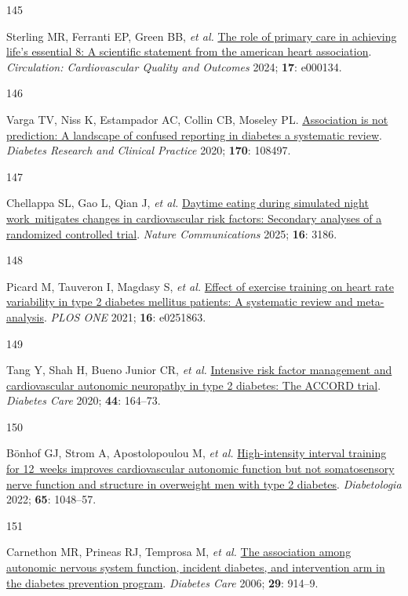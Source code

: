 \documentclass[
  a4paper,
  headsepline=true,
  open=left]{scrbook}
\newlength{\cslhangindent}
\newlength{\csllabelwidth}
\newlength{\cslentryspacingunit} %
\newenvironment{CSLReferences}[2] %
 {%
  \setlength{\parindent}{0pt}
  \ifodd #1
  \let\oldpar\par
  \def\par{\hangindent=\cslhangindent\oldpar}
  \fi
  \setlength{\parskip}{#2\cslentryspacingunit}
 }%
 {}
\newcommand{\CSLLeftMargin}[1]{\parbox[t]{\csllabelwidth}{#1}}
\newcommand{\CSLRightInline}[1]{\parbox[t]{\linewidth - \csllabelwidth}{#1}\break}
\begin{document}
\begin{CSLReferences}{0}{0}
\leavevmode{}%
\CSLLeftMargin{145 }%
\CSLRightInline{Sterling MR, Ferranti EP, Green BB, \emph{et al.}
\href{https://doi.org/10.1161/HCQ.0000000000000134}{The role of primary
care in achieving life{'}s essential 8: A scientific statement from the
american heart association}. \emph{Circulation: Cardiovascular Quality
and Outcomes} 2024; \textbf{17}: e000134.}

\leavevmode{}%
\CSLLeftMargin{146 }%
\CSLRightInline{Varga TV, Niss K, Estampador AC, Collin CB, Moseley PL.
\href{https://doi.org/10.1016/j.diabres.2020.108497}{Association is not
prediction: A landscape of confused reporting in diabetes {\textendash}
a systematic review}. \emph{Diabetes Research and Clinical Practice}
2020; \textbf{170}: 108497.}

\leavevmode{}%
\CSLLeftMargin{147 }%
\CSLRightInline{Chellappa SL, Gao L, Qian J, \emph{et al.}
\href{https://doi.org/10.1038/s41467-025-57846-y}{Daytime eating during
simulated night work~mitigates changes in cardiovascular risk factors:
Secondary analyses of a randomized controlled trial}. \emph{Nature
Communications} 2025; \textbf{16}: 3186.}

\leavevmode{}%
\CSLLeftMargin{148 }%
\CSLRightInline{Picard M, Tauveron I, Magdasy S, \emph{et al.}
\href{https://doi.org/10.1371/journal.pone.0251863}{Effect of exercise
training on heart rate variability in type 2 diabetes mellitus patients:
A systematic review and meta-analysis}. \emph{PLOS ONE} 2021;
\textbf{16}: e0251863.}

\leavevmode{}%
\CSLLeftMargin{149 }%
\CSLRightInline{Tang Y, Shah H, Bueno Junior CR, \emph{et al.}
\href{https://doi.org/10.2337/dc20-1842}{Intensive risk factor
management and cardiovascular autonomic neuropathy in type 2 diabetes:
The ACCORD trial}. \emph{Diabetes Care} 2020; \textbf{44}: 164--73.}

\leavevmode{}%
\CSLLeftMargin{150 }%
\CSLRightInline{Bönhof GJ, Strom A, Apostolopoulou M, \emph{et al.}
\href{https://doi.org/10.1007/s00125-022-05674-w}{High-intensity
interval training for 12~weeks improves cardiovascular autonomic
function but not somatosensory nerve function and structure in
overweight men with type 2 diabetes}. \emph{Diabetologia} 2022;
\textbf{65}: 1048--57.}

\leavevmode{}%
\CSLLeftMargin{151 }%
\CSLRightInline{Carnethon MR, Prineas RJ, Temprosa M, \emph{et al.}
\href{https://doi.org/10.2337/diacare.29.04.06.dc05-1729}{The
association among autonomic nervous system function, incident diabetes,
and intervention arm in the diabetes prevention program}. \emph{Diabetes
Care} 2006; \textbf{29}: 914--9.}


\end{CSLReferences}
\end{document}
